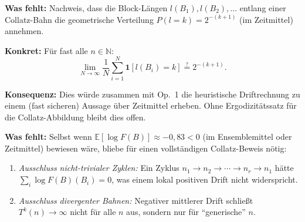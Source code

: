\documentclass[12pt,a4paper]{article}
\newcommand{\N}{\mathbb{N}}
\newcommand{\E}{\mathbb{E}}
\newcommand{\logF}{\log F(B)}
\begin{document}
\begin{tcolorbox}[lücke, title={Offenes Problem 2: Stationäre Bahnverteilung}]
\textbf{Was fehlt:}
Nachweis, dass die Block-Längen $l(B_1), l(B_2), \ldots$ entlang einer
Collatz-Bahn die geometrische Verteilung $P(l{=}k) = 2^{-(k+1)}$
(im Zeitmittel) annehmen.

\medskip
\textbf{Konkret:} Für fast alle $n \in \N$:
\[
  \lim_{N \to \infty} \frac{1}{N} \sum_{i=1}^{N} \mathbf{1}[l(B_i) = k]
  \stackrel{?}{=} 2^{-(k+1)}.
\]

\textbf{Konsequenz:} Dies würde zusammen mit Op.\ 1 die heuristische
Driftrechnung zu einem (fast sicheren) Aussage über Zeitmittel erheben.
Ohne Ergodizitätssatz für die Collatz-Abbildung bleibt dies offen.
\end{tcolorbox}

\begin{tcolorbox}[lücke, title={Offenes Problem 3: Gleichmäßige Negativität}]
\textbf{Was fehlt:}
Selbst wenn $\E[\logF] \approx -0{,}83 < 0$ (im Ensemblemittel oder Zeitmittel)
bewiesen wäre, bliebe für einen vollständigen Collatz-Beweis nötig:
\begin{enumerate}[noitemsep]
  \item \emph{Ausschluss nicht-trivialer Zyklen:}
        Ein Zyklus $n_1 \to n_2 \to \cdots \to n_r \to n_1$ hätte
        $\sum_i \logF(B_i) = 0$, was einem lokal positiven Drift nicht
        widerspricht.
  \item \emph{Ausschluss divergenter Bahnen:}
        Negativer mittlerer Drift schließt $T^k(n) \to \infty$ nicht
        für alle $n$ aus, sondern nur für ``generische'' $n$.
\end{enumerate}
\end{tcolorbox}
\end{document}
